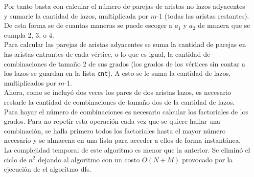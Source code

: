 \documentclass[a4paper,12pt,twocolumn]{article}
\begin{document}
	Por tanto basta con calcular el número de parejas de aristas no lazos adyacentes y sumarle la cantidad de lazos, multiplicada por $m$-1 (todas las aristas restantes). De esta forma se de cuantas maneras se puede escoger a $a_1$ y $a_2$ de manera que se cumpla 2, 3, o 4.\\
	Para calcular las parejas de aristas adyacentes se suma la cantidad de parejas en las aristas entrantes de cada vértice, o lo que es igual, la cantidad de combinaciones de tamaño 2 de sus grados (los grados de los vértices sin contar a los lazos se guardan en la lista \texttt{\ttfamily cnt}). A esto se le suma la cantidad de lazos, multiplicados por $m$-1.\\
	Ahora, como se incluyó dos veces los pares de dos aristas lazos, es necesario restarle la cantidad de combinaciones de tamaño dos de la cantidad de lazos.\\
	Para hayar el número de combinaciones es necesario calcular los factoriales de los grados. Para no repetir esta operación cada vez que se quiere hallar una combinación, se halla primero todos los factoriales hasta el mayor número necesario y se almacena en una lista para acceder a ellos de forma instantánea.\\
	La complejidad temporal de este algoritmo es menor que la anterior. Se eliminó el ciclo de $n^2$ dejando al algoritmo con un costo $O(N + M)$ provocado por la ejecución de el algoritmo dfs.

\label{end}
\end{document}
